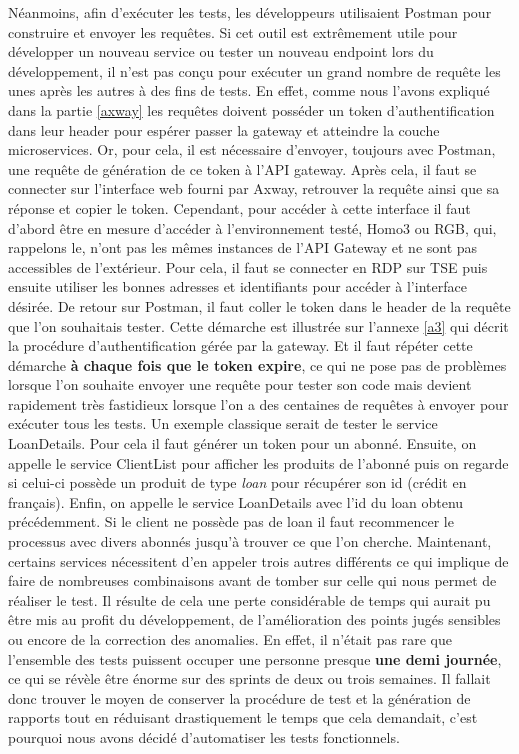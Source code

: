 	Néanmoins, afin d'exécuter les tests, les développeurs utilisaient Postman pour construire et envoyer les requêtes. Si cet outil est extrêmement utile pour développer un nouveau service ou tester un nouveau endpoint lors du développement, il n'est pas conçu pour exécuter un grand nombre de requête les unes après les autres à des fins de tests. En effet, comme nous l'avons expliqué dans la partie \ref{axway} les requêtes doivent posséder un token d'authentification dans leur header pour espérer passer la gateway et atteindre la couche microservices. Or, pour cela, il est nécessaire d'envoyer, toujours avec Postman, une requête de génération de ce token à l'API gateway. Après cela, il faut se connecter sur l'interface web fourni par Axway, retrouver la requête ainsi que sa réponse et copier le token. Cependant, pour accéder à cette interface il faut d'abord être en mesure d'accéder à l'environnement testé, Homo3 ou RGB, qui, rappelons le, n'ont pas les mêmes instances de l'API Gateway et ne sont pas accessibles de l'extérieur. Pour cela, il faut se connecter en RDP sur TSE puis ensuite utiliser les bonnes adresses et identifiants pour accéder à l'interface désirée. De retour sur Postman, il faut coller le token dans le header de la requête que l'on souhaitais tester. Cette démarche est illustrée sur l'annexe \ref{a3} qui décrit la procédure d'authentification gérée par la gateway. Et il faut répéter cette démarche \textbf{à chaque fois que le token expire}, ce qui ne pose pas de problèmes lorsque l'on souhaite envoyer une requête pour tester son code mais devient rapidement très fastidieux lorsque l'on a des centaines de requêtes à envoyer pour exécuter tous les tests. 
	Un exemple classique serait de tester le service LoanDetails. Pour cela il faut générer un token pour un abonné. Ensuite, on appelle le service ClientList pour afficher les produits de l'abonné puis on regarde si celui-ci possède un produit de type \textit{loan} pour récupérer son id (crédit en français). Enfin, on appelle le service LoanDetails avec l'id du loan obtenu précédemment. Si le client ne possède pas de loan il faut recommencer le processus avec divers abonnés jusqu'à trouver ce que l'on cherche. Maintenant, certains services nécessitent d'en   appeler trois autres différents ce qui implique de faire de nombreuses combinaisons avant de tomber sur celle qui nous permet de réaliser le test. Il résulte de cela une perte considérable de temps qui aurait pu être mis au profit du développement, de l'amélioration des points jugés sensibles ou encore de la correction des anomalies. En effet, il n'était pas rare que l'ensemble des tests puissent occuper une personne presque \textbf{une demi journée}, ce qui se révèle être énorme sur des sprints de deux ou trois semaines. Il fallait donc trouver le moyen de conserver la procédure de test et la génération de rapports tout en réduisant drastiquement le temps que cela demandait, c'est pourquoi nous avons décidé d'automatiser les tests fonctionnels.
	
	